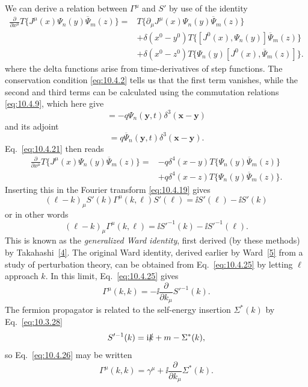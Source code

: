 We can derive a relation between $\Gamma^\mu$ and $S'$ by use of the identity
\begin{equation}
\begin{split}
\frac{\partial}{\partial x^\mu}
T\{J^\mu(x)\Psi_n(y)\overline\Psi_m(z)\}={}&
T\{\partial_\mu J^\mu(x)\Psi_n(y)\overline\Psi_m(z)\}
\\
&+\delta(x^0-y^0)T\{[J^0(x),\Psi_n(y)]\overline\Psi_m(z)\}
\\
&+\delta(x^0-z^0)T\{\Psi_n(y)[J^0(x),\overline\Psi_m(z)]\}.
\end{split}
\tag{10.4.21}\label{eq:10.4.21}
\end{equation}
where the delta functions arise from time-derivatives of step functions. The
conservation condition \eqref{eq:10.4.2} tells us that the first term vanishes,
while the second and third terms can be calculated using the commutation
relations \eqref{eq:10.4.9}, which here give
\begin{equation}
[J^0(\mathbf x,t),\Psi_n(\mathbf y,t)]
=-q\Psi_n(\mathbf y,t)\delta^3(\mathbf x-\mathbf y)
\tag{10.4.22}\label{eq:10.4.22}
\end{equation}
and its adjoint
\begin{equation}
[J^0(\mathbf x,t),\overline\Psi_n(\mathbf y,t)]
=q\overline\Psi_n(\mathbf y,t)\delta^3(\mathbf x-\mathbf y).
\tag{10.4.23}\label{eq:10.4.23}
\end{equation}
Eq.~\eqref{eq:10.4.21} then reads
\begin{equation}
\begin{split}
\frac{\partial}{\partial x^\mu}
T\{J^\mu(x)\Psi_n(y)\overline\Psi_m(z)\}={}&
-q\delta^4(x-y)T\{\Psi_n(y)\overline\Psi_m(z)\}
\\
&+q\delta^4(x-z)T\{\Psi_n(y)\overline\Psi_m(z)\}.
\end{split}
\tag{10.4.24}\label{eq:10.4.24}
\end{equation}
Inserting this in the Fourier transform \eqref{eq:10.4.19} gives
\[
(\ell-k)_\mu S'(k)\Gamma^\mu(k,\ell)S'(\ell)
=\ii S'(\ell)-\ii S'(k)
\]
or in other words
\begin{equation}
(\ell-k)_\mu\Gamma^\mu(k,\ell)
=\ii S'^{-1}(k)-\ii S'^{-1}(\ell).
\tag{10.4.25}\label{eq:10.4.25}
\end{equation}
This is known as the \emph{generalized Ward identity}, first derived (by these
methods) by Takahashi~\hyperref[ref:10.4]{[4]}. The original Ward identity,
derived earlier by Ward~\hyperref[ref:10.5]{[5]} from a study of perturbation
theory, can be obtained from Eq.~\eqref{eq:10.4.25} by letting $\ell$ approach
$k$. In this limit, Eq.~\eqref{eq:10.4.25} gives
\begin{equation}
\Gamma^\mu(k,k)=-\ii\frac{\partial}{\partial k_\mu}S'^{-1}(k).
\tag{10.4.26}\label{eq:10.4.26}
\end{equation}
The fermion propagator is related to the self-energy insertion $\Sigma^*(k)$
by Eq.~\eqref{eq:10.3.28}
\[
S'^{-1}(k)=\mathrm{i}\slashed{k}+m-\Sigma^*(k),
\]
so Eq.~\eqref{eq:10.4.26} may be written
\begin{equation}
\Gamma^\mu(k,k)=\gamma^\mu+\ii\frac{\partial}{\partial k_\mu}\Sigma^*(k).
\tag{10.4.27}\label{eq:10.4.27}
\end{equation}
